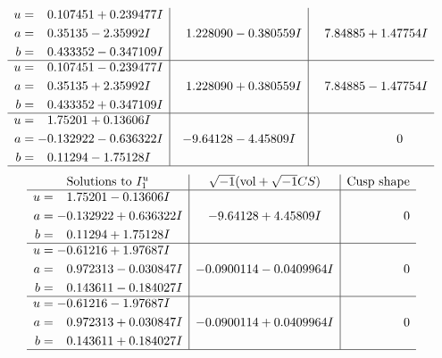 \documentclass[1p]{elsarticle_modified}
\theoremstyle{definition}
\newcommand{\I}{\sqrt{-1}}
\begin{document}
$$\begin{array}{c|c|c}
\begin{aligned}
u &= \phantom{-}0.107451 + 0.239477 I \\
a &= \phantom{-}0.35135 - 2.35992 I \\
b &= \phantom{-}0.433352 - 0.347109 I\end{aligned}
 & \phantom{-}1.228090 - 0.380559 I & \phantom{-}7.84885 + 1.47754 I \\ \hline\begin{aligned}
u &= \phantom{-}0.107451 - 0.239477 I \\
a &= \phantom{-}0.35135 + 2.35992 I \\
b &= \phantom{-}0.433352 + 0.347109 I\end{aligned}
 & \phantom{-}1.228090 + 0.380559 I & \phantom{-}7.84885 - 1.47754 I \\ \hline\begin{aligned}
u &= \phantom{-}1.75201 + 0.13606 I \\
a &= -0.132922 - 0.636322 I \\
b &= \phantom{-}0.11294 - 1.75128 I\end{aligned}
 & -9.64128 - 4.45809 I & \phantom{-0.000000 } 0\\
 \hline 
 \end{array}$$\newpage$$\begin{array}{c|c|c}  
\text{Solutions to }I^u_{1}& \I (\text{vol} + \sqrt{-1}CS) & \text{Cusp shape}\\
 \hline 
\begin{aligned}
u &= \phantom{-}1.75201 - 0.13606 I \\
a &= -0.132922 + 0.636322 I \\
b &= \phantom{-}0.11294 + 1.75128 I\end{aligned}
 & -9.64128 + 4.45809 I & \phantom{-0.000000 } 0 \\ \hline\begin{aligned}
u &= -0.61216 + 1.97687 I \\
a &= \phantom{-}0.972313 - 0.030847 I \\
b &= \phantom{-}0.143611 - 0.184027 I\end{aligned}
 & -0.0900114 - 0.0409964 I & \phantom{-0.000000 } 0 \\ \hline\begin{aligned}
u &= -0.61216 - 1.97687 I \\
a &= \phantom{-}0.972313 + 0.030847 I \\
b &= \phantom{-}0.143611 + 0.184027 I\end{aligned}
 & -0.0900114 + 0.0409964 I & \phantom{-0.000000 } 0\\
 \hline 
 \end{array}$$\newpage\newpage\renewcommand{\arraystretch}{1}
\end{document}
